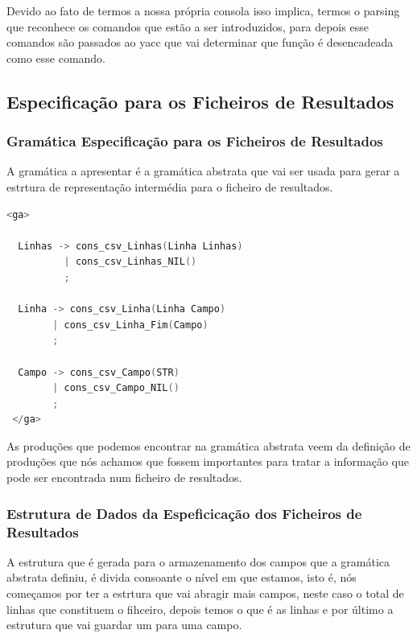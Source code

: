 \documentclass[11pt, a4paper, oneside]{article}
\begin{document}
Devido ao fato de termos a nossa própria consola isso implica, termos o parsing que reconhece os comandos que estão a ser introduzidos, para depois esse comandos são passados ao yacc que vai determinar que função é desencadeada como esse comando.

\subsection{Especificação para os Ficheiros de Resultados}

\subsubsection{Gramática Especificação para os Ficheiros de Resultados}

A gramática a apresentar é a gramática abstrata que vai ser usada para gerar a estrtura de representação intermédia para o ficheiro de resultados.

\begin{lstlisting}[language=C, caption={Gramática para a linguagem de especificação para os ficheiros de resultados.}]
<ga>
  
  Linhas -> cons_csv_Linhas(Linha Linhas)
          | cons_csv_Linhas_NIL()
          ;

  Linha -> cons_csv_Linha(Linha Campo)
        | cons_csv_Linha_Fim(Campo)
        ;

  Campo -> cons_csv_Campo(STR)
        | cons_csv_Campo_NIL()
        ;
 </ga>
\end{lstlisting}

As produções que podemos encontrar na gramática abstrata veem da definição de produções que nós achamos que fossem importantes para tratar a informação que pode ser encontrada num ficheiro de resultados.

\newpage
\subsubsection{Estrutura de Dados da Espeficicação dos Ficheiros de Resultados}

A estrutura que é gerada para o armazenamento dos campos que a gramática abstrata definiu, é divida consoante o nível em que estamos, isto é, nós começamos por ter a estrtura que vai abragir mais campos, neste caso o total de linhas que constituem o fihceiro, depois temos o que é as linhas
 e por último a estrutura que vai guardar um para uma campo.
\end{document}
